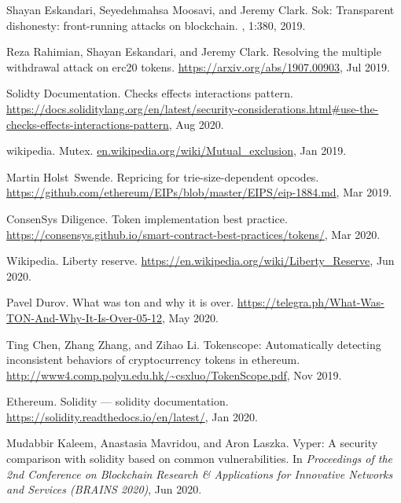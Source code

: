 \begin{thebibliography}{10}
Shayan Eskandari, Seyedehmahsa Moosavi, and Jeremy Clark.
\newblock Sok: Transparent dishonesty: front-running attacks on blockchain.
, 1:380, 2019.

Reza Rahimian, Shayan Eskandari, and Jeremy Clark.
\newblock Resolving the multiple withdrawal attack on erc20 tokens.
\newblock \url{https://arxiv.org/abs/1907.00903}, Jul 2019.

Solidty Documentation.
\newblock Checks effects interactions pattern.
\newblock
  \url{https://docs.soliditylang.org/en/latest/security-considerations.html\#use-the-checks-effects-interactions-pattern},
  Aug 2020.

wikipedia.
\newblock Mutex.
\newblock \url{en.wikipedia.org/wiki/Mutual_exclusion}, Jan 2019.

Martin Holst~Swende.
\newblock Repricing for trie-size-dependent opcodes.
\newblock \url{https://github.com/ethereum/EIPs/blob/master/EIPS/eip-1884.md},
  Mar 2019.

ConsenSys Diligence.
\newblock Token implementation best practice.
\newblock
  \url{https://consensys.github.io/smart-contract-best-practices/tokens/}, Mar
  2020.

Wikipedia.
\newblock Liberty reserve.
\newblock \url{https://en.wikipedia.org/wiki/Liberty_Reserve}, Jun 2020.

Pavel Durov.
\newblock What was ton and why it is over.
\newblock \url{https://telegra.ph/What-Was-TON-And-Why-It-Is-Over-05-12}, May
  2020.

Ting Chen, Zhang Zhang, and Zihao Li.
\newblock Tokenscope: Automatically detecting inconsistent behaviors of
  cryptocurrency tokens in ethereum.
\newblock \url{http://www4.comp.polyu.edu.hk/~csxluo/TokenScope.pdf}, Nov 2019.

Ethereum.
\newblock Solidity --- solidity documentation.
\newblock \url{https://solidity.readthedocs.io/en/latest/}, Jan 2020.

Mudabbir Kaleem, Anastasia Mavridou, and Aron Laszka.
\newblock Vyper: A security comparison with solidity based on common
  vulnerabilities.
\newblock In {\em Proceedings of the 2nd Conference on Blockchain Research &
  Applications for Innovative Networks and Services (BRAINS 2020)}, Jun 2020.


\end{thebibliography}
